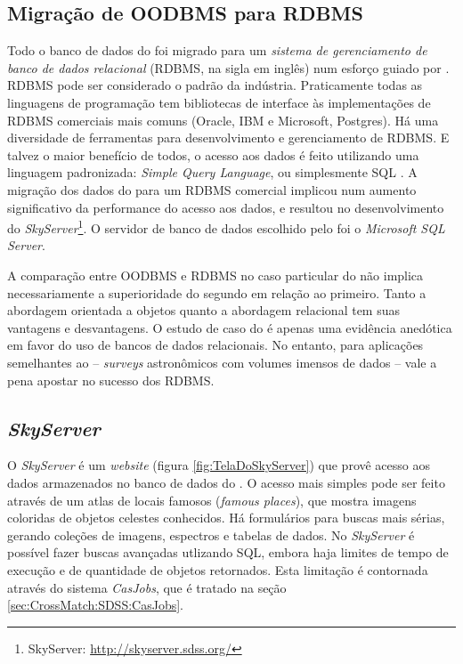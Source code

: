 \subsection{Migração de OODBMS para RDBMS}
Todo o banco de dados do \SDSS foi migrado para um {\em sistema de gerenciamento
de banco de dados relacional} \citep{Codd1970} (RDBMS, na sigla em inglês) num
esforço guiado por \citet{Thakar2004}. RDBMS pode ser considerado o padrão da
indústria. Praticamente todas as linguagens de programação tem bibliotecas de
interface às implementações de RDBMS comerciais mais comuns (Oracle, IBM e
Microsoft, Postgres). Há uma diversidade de ferramentas para desenvolvimento e
gerenciamento de RDBMS. E talvez o maior benefício de todos, o acesso aos dados
é feito utilizando uma linguagem padronizada: {\em Simple Query Language}, ou
simplesmente SQL \citep{Chamberlin1974}. A migração dos dados do \SDSS para um
RDBMS comercial implicou num aumento significativo da performance do acesso aos
dados, e resultou no desenvolvimento do {\em SkyServer}\footnote{\SDSS
SkyServer: \url{http://skyserver.sdss.org/}}. O servidor de banco de dados
escolhido pelo \SDSS foi o {\em Microsoft SQL Server}.

A comparação entre OODBMS e RDBMS no caso particular do \SDSS não implica
necessariamente a superioridade do segundo em relação ao primeiro. Tanto a
abordagem orientada a objetos quanto a abordagem relacional tem suas vantagens e
desvantagens. O estudo de caso do \SDSS é apenas uma evidência anedótica em
favor do uso de bancos de dados relacionais. No entanto, para aplicações
semelhantes ao \SDSS -- {\em surveys} astronômicos com volumes imensos de dados
-- vale a pena apostar no sucesso dos RDBMS.

\subsection{{\em SkyServer}}
\label{sec:CrossMatch:SDSS:SkyServer}
O {\em SkyServer} é um {\em website} (figura \ref{fig:TelaDoSkyServer}) que
provê acesso aos dados armazenados no banco de dados do \SDSS
\citep{Szalay2002}. O acesso mais simples pode ser feito através de um atlas de
locais famosos ({\em famous places}), que mostra imagens coloridas de objetos
celestes conhecidos. Há formulários para buscas mais sérias, gerando coleções de
imagens, espectros e tabelas de dados. No {\em SkyServer} é possível fazer
buscas avançadas utlizando SQL, embora haja limites de tempo de execução e de
quantidade de objetos retornados. Esta limitação é contornada através do sistema
{\em CasJobs}, que é tratado na seção \ref{sec:CrossMatch:SDSS:CasJobs}.

